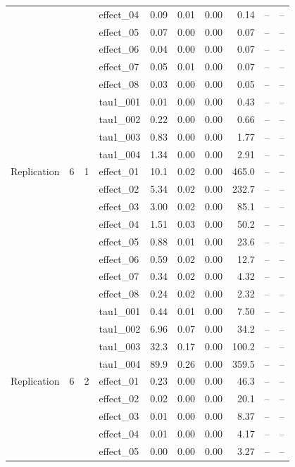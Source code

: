 {\begin{longtable}{lccl rr r r rr}
 &  &  & effect\_04 & 0.09 & 0.01 & 0.00 & 0.14 & -- & --\\
 &  &  & effect\_05 & 0.07 & 0.00 & 0.00 & 0.07 & -- & --\\
 &  &  & effect\_06 & 0.04 & 0.00 & 0.00 & 0.07 & -- & --\\
 &  &  & effect\_07 & 0.05 & 0.01 & 0.00 & 0.07 & -- & --\\
 &  &  & effect\_08 & 0.03 & 0.00 & 0.00 & 0.05 & -- & --\\
 &  &  & tau1\_001 & 0.01 & 0.00 & 0.00 & 0.43 & -- & --\\
 &  &  & tau1\_002 & 0.22 & 0.00 & 0.00 & 0.66 & -- & --\\
 &  &  & tau1\_003 & 0.83 & 0.00 & 0.00 & 1.77 & -- & --\\
 &  &  & tau1\_004 & 1.34 & 0.00 & 0.00 & 2.91 & -- & --\\
\midrule
Replication & 6 & 1 & effect\_01 & 10.1 & 0.02 & 0.00 & 465.0 & -- & --\\
 &  &  & effect\_02 & 5.34 & 0.02 & 0.00 & 232.7 & -- & --\\
 &  &  & effect\_03 & 3.00 & 0.02 & 0.00 & 85.1 & -- & --\\
 &  &  & effect\_04 & 1.51 & 0.03 & 0.00 & 50.2 & -- & --\\
 &  &  & effect\_05 & 0.88 & 0.01 & 0.00 & 23.6 & -- & --\\
 &  &  & effect\_06 & 0.59 & 0.02 & 0.00 & 12.7 & -- & --\\
 &  &  & effect\_07 & 0.34 & 0.02 & 0.00 & 4.32 & -- & --\\
 &  &  & effect\_08 & 0.24 & 0.02 & 0.00 & 2.32 & -- & --\\
 &  &  & tau1\_001 & 0.44 & 0.01 & 0.00 & 7.50 & -- & --\\
 &  &  & tau1\_002 & 6.96 & 0.07 & 0.00 & 34.2 & -- & --\\
 &  &  & tau1\_003 & 32.3 & 0.17 & 0.00 & 100.2 & -- & --\\
 &  &  & tau1\_004 & 89.9 & 0.26 & 0.00 & 359.5 & -- & --\\
\midrule
Replication & 6 & 2 & effect\_01 & 0.23 & 0.00 & 0.00 & 46.3 & -- & --\\
 &  &  & effect\_02 & 0.02 & 0.00 & 0.00 & 20.1 & -- & --\\
 &  &  & effect\_03 & 0.01 & 0.00 & 0.00 & 8.37 & -- & --\\
 &  &  & effect\_04 & 0.01 & 0.00 & 0.00 & 4.17 & -- & --\\
 &  &  & effect\_05 & 0.00 & 0.00 & 0.00 & 3.27 & -- & --\\

\end{longtable}}
